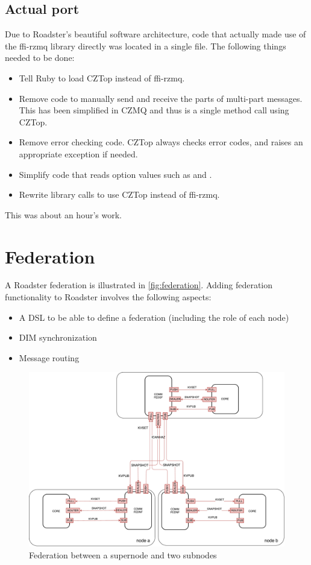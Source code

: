 \subsection{Actual port}
Due to Roadster's beautiful software architecture, code that actually made use
of the ffi-rzmq library directly was located in a single file. The following
things needed to be done:

\begin{itemize}
\item Tell Ruby to load CZTop instead of ffi-rzmq.
\item Remove code to manually send and receive the parts of multi-part messages. This has been simplified
in CZMQ and thus is a single method call using CZTop.
\item Remove error checking code. CZTop always checks error codes, and raises
an appropriate exception if needed.
\item Simplify code that reads option values such as  and .
\item Rewrite library calls to use CZTop instead of ffi-rzmq.
\end{itemize}

This was about an hour's work.

\section{Federation}\label{sec:approach:federation}
A Roadster federation is illustrated in \autoref{fig:federation}. Adding federation
functionality to Roadster involves the following aspects:
\begin{itemize}
	\item A \gls{DSL} to be able to define a federation (including the role of each node)
	\item DIM synchronization
	\item Message routing
\end{itemize}

\begin{figure}[]
	\includegraphics[width=\textwidth]{img/federation_protocol.pdf}
	\caption{Federation between a supernode and two subnodes}
	\label{fig:federation}
\end{figure}

